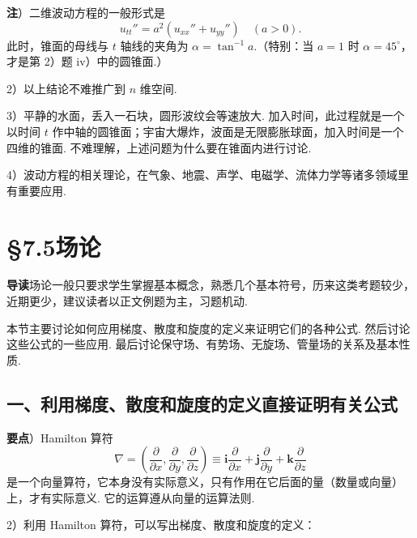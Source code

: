 \documentclass[UTF8, 12pt, fontset=fandol, oneside]{ctexart}
\begin{document}
\noindent\textbf{注}）二维波动方程的一般形式是
\[
u_{tt}''=a^2(u_{xx}''+u_{yy}'')\quad(a>0).
\]
此时，锥面的母线与 $t$ 轴线的夹角为 $\alpha=\tan^{-1}a$.（特别：当 $a=1$ 时 $\alpha=45^\circ$，才是第 2）题 iv）中的圆锥面.）

2）以上结论不难推广到 $n$ 维空间.

3）平静的水面，丢入一石块，圆形波纹会等速放大. 加入时间，此过程就是一个以时间 $t$ 作中轴的圆锥面；宇宙大爆炸，波面是无限膨胀球面，加入时间是一个四维的锥面. 不难理解，上述问题为什么要在锥面内进行讨论.

4）波动方程的相关理论，在气象、地震、声学、电磁学、流体力学等诸多领域里有重要应用.

\section*{§7.5\quad 场\quad 论}

\noindent\textbf{导读}\quad 场论一般只要求学生掌握基本概念，熟悉几个基本符号，历来这类考题较少，近期更少，建议读者以正文例题为主，习题机动.

本节主要讨论如何应用梯度、散度和旋度的定义来证明它们的各种公式. 然后讨论这些公式的一些应用. 最后讨论保守场、有势场、无旋场、管量场的关系及基本性质.

\subsection*{一、利用梯度、散度和旋度的定义直接证明有关公式}

\noindent\textbf{要点}）Hamilton 算符
\[
\nabla=\left(\frac{\partial}{\partial x},\frac{\partial}{\partial y},\frac{\partial}{\partial z}\right)
\equiv\mathbf i\frac{\partial}{\partial x}+\mathbf j\frac{\partial}{\partial y}+\mathbf k\frac{\partial}{\partial z}
\]
是一个向量算符，它本身没有实际意义，只有作用在它后面的量（数量或向量）上，才有实际意义. 它的运算遵从向量的运算法则.

2）利用 Hamilton 算符，可以写出梯度、散度和旋度的定义：
\end{document}
